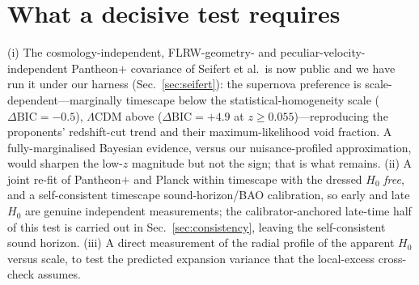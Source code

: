 \documentclass[aps,prd,twocolumn,nofootinbib,superscriptaddress,floatfix]{revtex4-2}
\newcommand{\Ho}{H_{0}}
\newcommand{\Lcdm}{\Lambda\mathrm{CDM}}
\newcommand{\dBIC}{\Delta\mathrm{BIC}}
\begin{document}
\section{What a decisive test requires}
\label{sec:future}
(i) The cosmology-independent, FLRW-geometry- and peculiar-velocity-independent
Pantheon$+$ covariance of Seifert et al.\ is now public and we have run it under
our harness (Sec.~\ref{sec:seifert}): the supernova preference is
scale-dependent---marginally timescape below the statistical-homogeneity scale
($\dBIC=-0.5$), $\Lcdm$ above ($\dBIC=+4.9$ at $z\geq0.055$)---reproducing the
proponents' redshift-cut trend and their maximum-likelihood void fraction. A
fully-marginalised Bayesian evidence, versus our nuisance-profiled approximation,
would sharpen the low-$z$ magnitude but not the sign; that is what remains.
(ii) A joint re-fit of Pantheon$+$ and Planck within timescape with the dressed
$\Ho$ \emph{free}, and a self-consistent timescape sound-horizon/BAO calibration,
so early and late $\Ho$ are genuine independent measurements; the
calibrator-anchored late-time half of this test is carried out in
Sec.~\ref{sec:consistency}, leaving the self-consistent sound horizon. (iii) A direct
measurement of the radial profile of the apparent $\Ho$ versus scale, to test the
predicted expansion variance that the local-excess cross-check assumes.
\end{document}
